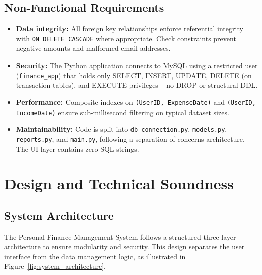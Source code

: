 \documentclass[12pt, a4paper]{article}
\begin{document}
\subsection{Non-Functional Requirements}

\begin{itemize}[leftmargin=2em]
  \item \textbf{Data integrity:} All foreign key relationships enforce referential
        integrity with \texttt{ON DELETE CASCADE} where appropriate. Check constraints
        prevent negative amounts and malformed email addresses.
  \item \textbf{Security:} The Python application connects to MySQL using a restricted
        user (\texttt{finance\_app}) that holds only SELECT, INSERT, UPDATE, DELETE (on
        transaction tables), and EXECUTE privileges -- no DROP or structural DDL.
  \item \textbf{Performance:} Composite indexes on \texttt{(UserID, ExpenseDate)} and
        \texttt{(UserID, IncomeDate)} ensure sub-millisecond filtering on typical dataset
        sizes.
  \item \textbf{Maintainability:} Code is split into \texttt{db\_connection.py},
        \texttt{models.py}, \texttt{reports.py}, and \texttt{main.py}, following a
        separation-of-concerns architecture. The UI layer contains zero SQL strings.
\end{itemize}

\newpage

\section{Design and Technical Soundness}

\subsection{System Architecture}

The Personal Finance Management System follows a structured three-layer architecture
to ensure modularity and security. This design separates the user interface from the
data management logic, as illustrated in Figure~\ref{fig:system_architecture}.
\end{document}
